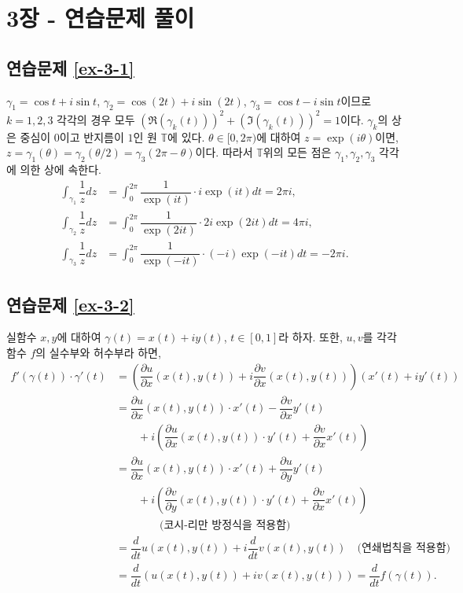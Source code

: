 
\section*{3장 - 연습문제 풀이}

\subsection*{연습문제 \ref{ex-3-1}}

$\gamma_1 = \cos t + i\sin t$, $\gamma_2 = \cos (2t) + i\sin (2t)$,
$\gamma_3 = \cos t - i\sin t$이므로
$k=1,2,3$ 각각의 경우 모두 $(\Re(\gamma_k(t)))^2 + (\Im(\gamma_k(t)))^2=1$이다.
$\gamma_k$의 상은 중심이 $0$이고 반지름이 $1$인 원 $\mathbb T$에 있다.
$\theta \in [0,2\pi)$에 대하여 $z = \exp(i\theta)$이면,
$z = \gamma_1(\theta) = \gamma_2(\theta/2) = \gamma_3(2\pi - \theta)$이다.
따라서 $\mathbb T$위의 모든 점은 $\gamma_1, \gamma_2, \gamma_3$ 각각에 의한 상에
속한다.
\begin{align*}
\int_{\gamma_1} \dfrac1z dz &= \int_0^{2\pi} \dfrac1{\exp(it)}\cdot i\exp(it)dt = 2\pi i, \\
\int_{\gamma_2} \dfrac1z dz &= \int_0^{2\pi} \dfrac1{\exp(2it)}\cdot 2i\exp(2it)dt = 4\pi i, \\
\int_{\gamma_3} \dfrac1z dz &= \int_0^{2\pi} \dfrac1{\exp(-it)}\cdot (-i)\exp(-it)dt = -2\pi i.
\end{align*}

\subsection*{연습문제 \ref{ex-3-2}}

실함수 $x,y$에 대하여 $\gamma(t) = x(t) +iy(t)$, $t\in[0,1]$라 하자.
또한, $u,v$를 각각 함수 $f$의 실수부와 허수부라 하면,
\begin{align*}
f'(\gamma(t))\cdot\gamma'(t)
&= \left( \dfrac{\partial u}{\partial x}(x(t),y(t)) +
i \dfrac{\partial v}{\partial x}(x(t),y(t)) \right) (x'(t) + iy'(t)) \\
&= \dfrac{\partial u}{\partial x}(x(t),y(t)) \cdot x'(t) - \dfrac{\partial v}{\partial x}y'(t) \\
&\qquad +i\left( \dfrac{\partial u}{\partial x}(x(t),y(t)) \cdot y'(t) + \dfrac{\partial v}{\partial x}x'(t) \right) \\
&= \dfrac{\partial u}{\partial x}(x(t),y(t)) \cdot x'(t) + \dfrac{\partial u}{\partial y}y'(t) \\
&\qquad +i\left( \dfrac{\partial v}{\partial y}(x(t),y(t)) \cdot y'(t) + \dfrac{\partial v}{\partial x}x'(t) \right) \\
&\qquad\qquad \text{(코시-리만 방정식을 적용함)} \\
&= \dfrac d{dt} u(x(t), y(t)) + i \dfrac d{dt} v(x(t),y(t)) \quad\text{(연쇄법칙을 적용함)} \\
&= \dfrac d{dt} (u(x(t), y(t)) + i v(x(t),y(t))) = \dfrac d{dt} f(\gamma(t)).
\end{align*}

